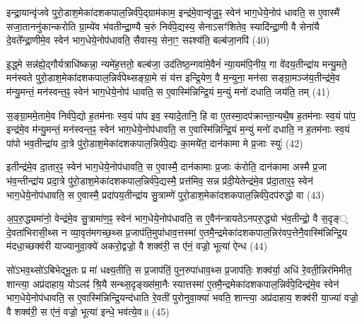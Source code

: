 इन्द्रा॒यान्वृ॑जवे पुरो॒डाश॒मेका॑दशकपाल॒न्निर्व॑पे॒द्ग्राम॑काम॒ इन्द्र॑मे॒वान्वृ॑जु॒ꣴ॒ स्वेन॑ भाग॒धेये॒नोप॑ धावति॒ स ए॒वास्मै॑ सजा॒ताननु॑कान्करोति ग्रा॒म्ये॑व भ॑वतीन्द्रा॒ण्यै च॒रुं निर्व॑पे॒द्यस्य॒ सेना\-ऽसꣳ॑शितेव॒ स्यादि॑न्द्रा॒णी वै सेना॑यै दे॒वते᳚न्द्रा॒णीमे॒व स्वेन॑ भाग॒धेये॒नोप॑धावति॒ सैवास्य॒ सेना॒ꣳ॒ सꣴश्य॑ति॒ बल्ब॑जा॒नपि॑ (40)

इ॒द्ध्मे सन्न॑ह्ये॒द्गौर्यत्राधि॑ष्कन्ना॒ न्यमे॑ह॒त्ततो॒ बल्ब॑जा॒ उद॑तिष्ठ॒न्गवा॑मे॒वैनं॑ न्या॒यम॑पि॒नीय॒ गा वे॑दय॒तीन्द्रा॑य मन्यु॒मते॒ मन॑स्वते पुरो॒डाश॒मेका॑दशकपाल॒न्निर्व॑पेथ्सङ्ग्रा॒मे सं य॑त्त इन्द्रि॒येण॒ वै म॒न्युना॒ मन॑सा सङ्ग्रा॒मञ्ज॑य॒तीन्द्र॑मे॒व म॑न्यु॒मन्तं॒ मन॑स्वन्त॒ꣴ॒ स्वेन॑ भाग॒धेये॒नोप॑ धावति॒ स ए॒वास्मि॑न्निन्द्रि॒यं म॒न्युं मनो॑ दधाति॒ जय॑ति॒ तम् (41)

स॒ङ्ग्रा॒ममे॒तामे॒व निर्व॑पे॒द्यो ह॒तम॑नाः स्व॒यं पा॑प इव॒ स्यादे॒तानि॒ हि वा ए॒तस्मा॒दप॑क्रान्ता॒न्यथै॒ष ह॒तम॑नाः स्व॒यं पा॑प॒ इन्द्र॑मे॒व म॑न्यु॒मन्तं॒ मन॑स्वन्त॒ꣴ॒ स्वेन॑ भाग॒धेये॒नोप॑धावति॒ स ए॒वास्मि॑न्निन्द्रि॒यं म॒न्युं मनो॑ दधाति॒ न ह॒तम॑नाः स्व॒यं पा॑पो भव॒तीन्द्रा॑य दा॒त्रे पु॑रो॒डाश॒मेका॑दशकपाल॒न्निर्व॑पे॒द्यः का॒मये॑त॒ दान॑कामा मे प्र॒जाः स्युः॑ (42)

इतीन्द्र॑मे॒व दा॒तार॒ꣴ॒ स्वेन॑ भाग॒धेये॒नोप॑धावति॒ स ए॒वास्मै॒ दान॑कामाः प्र॒जाः क॑रोति॒ दान॑कामा अस्मै प्र॒जा भ॑व॒न्तीन्द्रा॑य प्रदा॒त्रे पु॑रो॒डाश॒मेका॑दशकपाल॒न्निर्व॑पे॒द्यस्मै॒ प्रत्त॑मिव॒ सन्न प्र॑दी॒येतेन्द्र॑मे॒व प्र॑दा॒तार॒ꣴ॒ स्वेन॑ भाग॒धेये॒नोप॑धावति॒ स ए॒वास्मै॒ प्रदा॑पय॒तीन्द्रा॑य सु॒त्राम्णे॑ पुरो॒डाश॒मेका॑दशकपाल॒न्निर्व॑पे॒दप॑रुद्धो वा (43)

अ॒प॒रु॒द्ध्यमा॑नो॒ वेन्द्र॑मे॒व सु॒त्रामा॑ण॒ꣴ॒ स्वेन॑ भाग॒धेये॒नोप॑धावति॒ स ए॒वैन॑न्त्रायते\-ऽनपरु॒द्ध्यो भ॑व॒तीन्द्रो॒ वै स॒दृङ्् दे॒वता॑भिरासी॒थ्स न व्या॒वृत॑मगच्छ॒थ्स प्र॒जाप॑ति॒मुपा॑धाव॒त्तस्मा॑ ए॒तमै॒न्द्रमेका॑दशकपाल॒न्निर॑वप॒त्तेनै॒वास्मि॑न्निन्द्रि॒य म॑दधा॒च्छक्व॑री याज्यानुवा॒क्ये॑ अकरो॒द्वज्रो॒ वै शक्व॑री॒ स ए॑नं॒ वज्रो॒ भूत्या॑ ऐन्ध (44)

सो॑\-ऽभव॒थ्सो॑\-ऽबिभेद्भू॒तः प्र मा॑ धक्ष्य॒तीति॒ स प्र॒जाप॑तिं॒ पुन॒रुपा॑धाव॒थ्स प्र॒जाप॑तिः॒ शक्व॑र्या॒ अधि॑ रे॒वती॒न्निर॑मिमीत॒ शान्त्या॒ अप्र॑दाहाय॒ यो\-ऽलꣴ॑ श्रि॒यै सन्थ्स॒दृङ्ख्स॑मा॒नैः स्यात्तस्मा॑ ए॒तमै॒न्द्रमेका॑दशकपाल॒न्निर्व॑पे॒दिन्द्र॑मे॒व स्वेन॑ भाग॒धेये॒नोप॑धावति॒ स ए॒वास्मि॑न्निन्द्रि॒यन्द॑धाति रे॒वती॑ पुरोनुवा॒क्या॑ भवति॒ शान्त्या॒ अप्र॑दाहाय॒ शक्व॑री या॒ज्या॑ वज्रो॒ वै शक्व॑री॒ स ए॑नं॒ वज्रो॒ भूत्या॑ इन्धे॒ भव॑त्ये॒व॥ (45)

{\anuvakamend[{अपि॒ तꣴ स्यु॑र्वैन्ध भवति॒ चतु॑र्दश च॥७॥}]}

